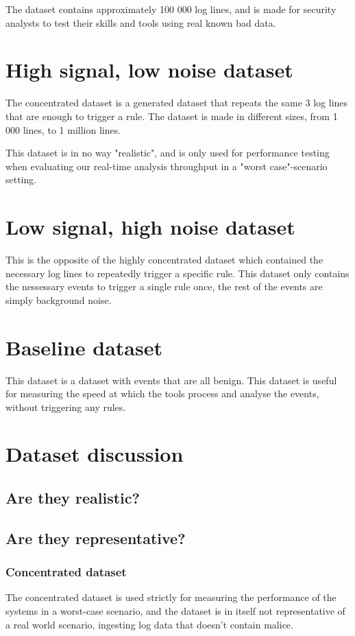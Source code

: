 The dataset contains approximately 100 000 log lines, and is made for security analysts to test their skills and tools using real known bad data.

\section{High signal, low noise dataset}
The concentrated dataset is a generated dataset that repeats the same 3 log lines that are enough to trigger a rule. The dataset is made in different sizes, from 1 000 lines, to 1 million lines.

This dataset is in no way "realistic", and is only used for performance testing when evaluating our real-time analysis throughput in a "worst case"-scenario setting.

\section{Low signal, high noise dataset}
This is the opposite of the highly concentrated dataset which contained the necessary log lines to repeatedly trigger a specific rule. This dataset only contains the nessessary events to trigger a single rule once, the rest of the events are simply background noise.

\section{Baseline dataset}
This dataset is a dataset with events that are all benign. This dataset is useful for measuring the speed at which the tools process and analyse the events, without triggering any rules.

\section{Dataset discussion}

\subsection{Are they realistic?}


\subsection{Are they representative?}
\subsubsection{Concentrated dataset}
The concentrated dataset is used strictly for measuring the performance of the systems in a worst-case scenario, and the dataset is in itself not representative of a real world scenario, ingesting log data that doesn't contain malice.

